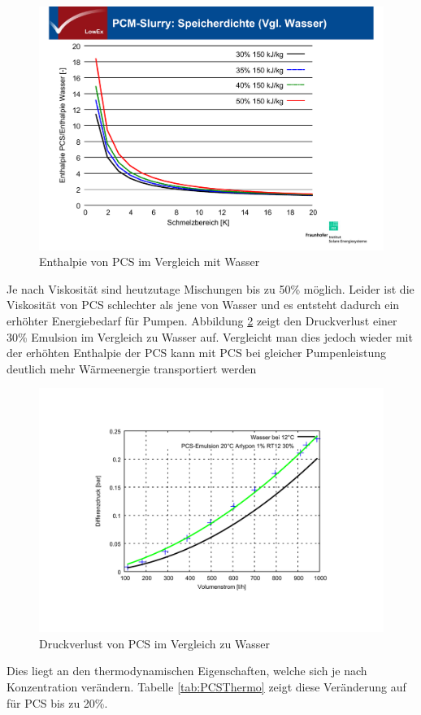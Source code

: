 \documentclass[11pt,a4paper]{scrartcl}
\begin{document}
\begin{figure}[h!]
\begin{center}
\includegraphics[scale=0.4]{images/Henning1.pdf}
\caption{Enthalpie von PCS im Vergleich mit Wasser \cite{Henning}}
\label{fig:PCSWasser}
\end{center}
\end{figure}
Je nach Viskosität sind heutzutage Mischungen bis zu 50\% möglich. Leider ist
die Viskosität von PCS schlechter als jene von Wasser und es entsteht dadurch
ein erhöhter Energiebedarf für Pumpen. Abbildung \ref{fig:PCSDruck} zeigt den
Druckverlust einer 30\% Emulsion im Vergleich zu Wasser auf. Vergleicht man dies
jedoch wieder mit der erhöhten Enthalpie der PCS kann mit PCS bei gleicher
Pumpenleistung deutlich mehr Wärmeenergie transportiert werden
\begin{figure}[h!]
\begin{center}
\includegraphics[scale=0.4]{images/Henning2.pdf}
\caption{Druckverlust von PCS im Vergleich zu Wasser \cite{Henning}}
\label{fig:PCSDruck}
\end{center}
\end{figure}
Dies liegt an den thermodynamischen Eigenschaften, welche sich je nach
Konzentration verändern. Tabelle \ref{tab:PCSThermo} zeigt diese Veränderung auf
für PCS bis zu 20\%.
\end{document}
